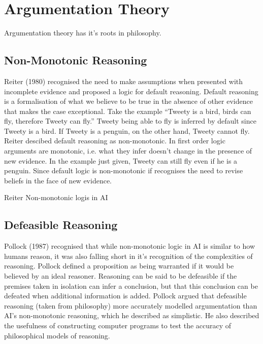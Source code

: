 \section{Argumentation Theory}

Argumentation theory has it's roots in philosophy.

\subsection{Non-Monotonic Reasoning}

Reiter (1980) recognised the need to make assumptions when presented with incomplete evidence and proposed a logic for default reasoning. Default reasoning is a formalisation of what we believe to be true in the absence of other evidence that makes the case exceptional.
Take the example “Tweety is a bird, birds can fly, therefore Tweety can fly.” Tweety being able to fly is inferred by default since Tweety is a bird. If Tweety is a penguin, on the other hand, Tweety cannot fly. Reiter descibed default reasoning as non-monotonic. In first order logic arguments are monotonic, i.e. what they infer doesn’t change in the presence of new evidence. In the example just given, Tweety can still fly even if he is a penguin. Since default logic is non-monotonic if recognises the need to revise beliefs in the face of new evidence.

Reiter Non-monotonic logis in AI




\subsection{Defeasible Reasoning}

Pollock (1987) recognised that while non-monotonic logic in AI is similar to how humans reason, it was also falling short in it’s recognition of the complexities of reasoning. Pollock defined a proposition as being warranted if it would be believed by an ideal reasoner. Reasoning can be said to be defeasible if the premises taken in isolation can infer a conclusion, but that this conclusion can be defeated when additional information is added. Pollock argued that defeasible reasoning (taken from philosophy) more accurately modelled argumentation than AI's non-monotonic reasoning, which he described as simplistic. He also described the usefulness of constructing computer programs to test the accuracy of philosophical models of reasoning.

